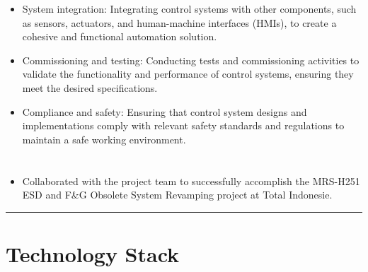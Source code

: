 \documentclass[12pt]{res}
\begin{document}
\begin{resume}
\begin{multicols}{2}
\begin{itemize}
\item System integration: Integrating control systems with other components, such as sensors, actuators, and human-machine interfaces (HMIs), to create a cohesive and functional automation solution.

\item Commissioning and testing: Conducting tests and commissioning activities to validate the functionality and performance of control systems, ensuring they meet the desired specifications.

\item Compliance and safety: Ensuring that control system designs and implementations comply with relevant safety standards and regulations to maintain a safe working environment.
		\end{itemize}
	\section{}
		\begin{itemize}
			\setlength{\itemindent}{0pt}
			\item Collaborated with the project team to successfully accomplish the MRS-H251 ESD and F\&G Obsolete System Revamping project at Total Indonesie.
		\end{itemize}
\end{multicols}

\vspace{-20pt}
\begin{minipage}[t]{0.55\linewidth}
	\rule{0.25\textwidth}{2pt}
	\begin{multicols}{2}
		\section{Technology Stack}
		\columnbreak
		\section{}
	\end{multicols}
	\vspace{1pt}
\end{minipage}
\hfill
\begin{minipage}[t]{0.42\linewidth}
	\vspace{18pt}

\end{minipage}
\end{resume}
\end{document}
